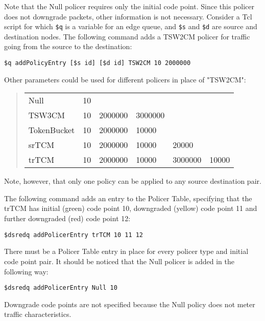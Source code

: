 Note that the Null policer requires only the initial code point. Since
this policer does not downgrade packets, other information is not necessary.  
Consider a Tcl script for which 
  {\tt \$q} is a variable for an edge queue, 
  and {\tt \$s} and {\tt \$d} are source and destination nodes.   
The following command adds a TSW2CM policer for traffic going from 
  the source to the destination:

{\tt \$q addPolicyEntry [\$s id] [\$d id] TSW2CM 10 2000000}

Other parameters could be used for different policers 
  in place of "TSW2CM":

\begin{quote}
\begin{tabular}{llllll}
Null&10\\
TSW3CM&10&2000000&3000000\\
TokenBucket&10&2000000&10000\\
srTCM&10&2000000&10000&20000\\
trTCM&10&2000000&10000&3000000&10000
\end{tabular}
\end{quote}

Note, however, 
  that only one policy can be applied to any source destination pair.

The following command adds an entry to the Policer Table, 
  specifying that the trTCM has
  initial (green) code point 10, downgraded (yellow) code point 11 
  and further downgraded (red) code point 12:

{\tt \$dsredq addPolicerEntry trTCM 10 11 12}

There must be a Policer Table entry in place for every 
policer type and initial code point pair.
It should be noticed that the Null policer is added in the following way:

{\tt \$dsredq addPolicerEntry Null 10}

Downgrade code points are not specified because the Null policy does not
meter traffic characteristics.


